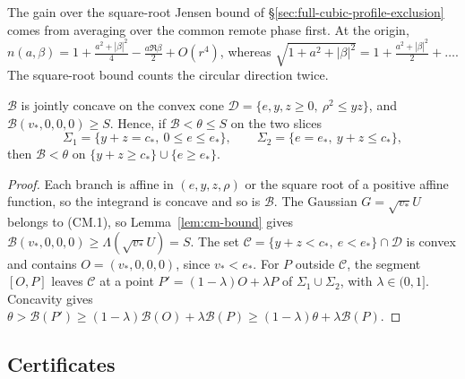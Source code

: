 The gain over the square-root Jensen bound of \S\ref{sec:full-cubic-profile-exclusion} comes from averaging over the common remote phase first. At the origin,
$n(a,\beta)=1+\frac{a^2+|\beta|^2}4-\frac{a\Re\beta}2+O(r^4)$, whereas $\sqrt{1+a^2+|\beta|^2}=1+\frac{a^2+|\beta|^2}2+\dots$. The square-root bound
counts the circular direction twice.

\begin{lemma}\label{lem:cm-slices}
$\mathcal B$ is jointly concave on the convex cone $\mathcal D=\{e,y,z\ge0,\ \rho^2\le yz\}$, and $\mathcal B(v_*,0,0,0)\ge S$. Hence, if
$\mathcal B<\theta\le S$ on the two slices
\[
 \Sigma_1=\{y+z=c_*,\ 0\le e\le e_*\},\qquad \Sigma_2=\{e=e_*,\ y+z\le c_*\},
\]
then $\mathcal B<\theta$ on $\{y+z\ge c_*\}\cup\{e\ge e_*\}$.
\end{lemma}
\begin{proof}
Each branch is affine in $(e,y,z,\rho)$ or the square root of a positive affine function, so the integrand is concave and so is $\mathcal B$.
The Gaussian $G=\sqrt{v_*}U$ belongs to (CM.1), so Lemma~\ref{lem:cm-bound} gives $\mathcal B(v_*,0,0,0)\ge\Lambda(\sqrt{v_*}U)=S$. The set
$\mathcal C=\{y+z<c_*,\ e<e_*\}\cap\mathcal D$ is convex and contains $O=(v_*,0,0,0)$, since $v_*<e_*$. For $P$ outside $\mathcal C$, the segment $[O,P]$ leaves
$\mathcal C$ at a point $P'=(1-\lambda)O+\lambda P$ of $\Sigma_1\cup\Sigma_2$, with $\lambda\in(0,1]$. Concavity gives
$\theta>\mathcal B(P')\ge(1-\lambda)\mathcal B(O)+\lambda\mathcal B(P)\ge(1-\lambda)\theta+\lambda\mathcal B(P)$.
\end{proof}

\subsection{Certificates}
\label{sec:cm-certificates}
